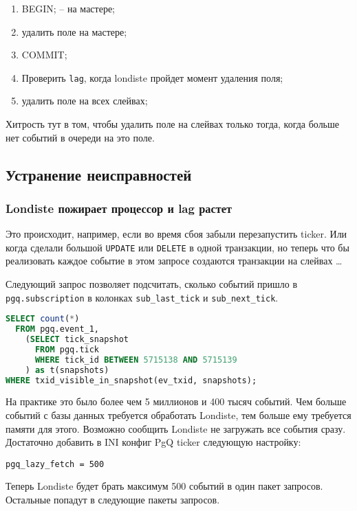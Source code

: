 \begin{enumerate}
 \item BEGIN; -- на мастере;
 \item удалить поле на мастере;
 \item COMMIT;
 \item Проверить \lstinline!lag!, когда londiste пройдет момент удаления поля;
 \item удалить поле на всех слейвах;
\end{enumerate}

Хитрость тут в том, чтобы удалить поле на слейвах только тогда, когда больше нет событий в очереди на это поле.


\subsection{Устранение неисправностей}

\subsubsection{Londiste пожирает процессор и lag растет}

Это происходит, например, если во время сбоя забыли перезапустить ticker. Или когда сделали большой \lstinline!UPDATE! или \lstinline!DELETE! в одной транзакции, но теперь что бы реализовать каждое событие в этом запросе создаются транзакции на слейвах \dots

Следующий запрос позволяет подсчитать, сколько событий пришло в \lstinline!pgq.subscription! в колонках \lstinline!sub_last_tick! и \lstinline!sub_next_tick!.

\begin{lstlisting}[language=SQL,label=lst:londiste24,caption=Устранение неисправностей]
SELECT count(*)
  FROM pgq.event_1,
    (SELECT tick_snapshot
      FROM pgq.tick
      WHERE tick_id BETWEEN 5715138 AND 5715139
    ) as t(snapshots)
WHERE txid_visible_in_snapshot(ev_txid, snapshots);
\end{lstlisting}

На практике это было более чем 5 миллионов и 400 тысяч событий. Чем больше событий с базы данных требуется обработать Londiste, тем больше ему требуется памяти для этого. Возможно сообщить Londiste не загружать все события сразу. Достаточно добавить в INI конфиг PgQ ticker следующую настройку:

\begin{lstlisting}[label=lst:londiste25,caption=Устранение неисправностей]
pgq_lazy_fetch = 500
\end{lstlisting}

Теперь Londiste будет брать максимум 500 событий в один пакет запросов. Остальные попадут в следующие пакеты запросов.
